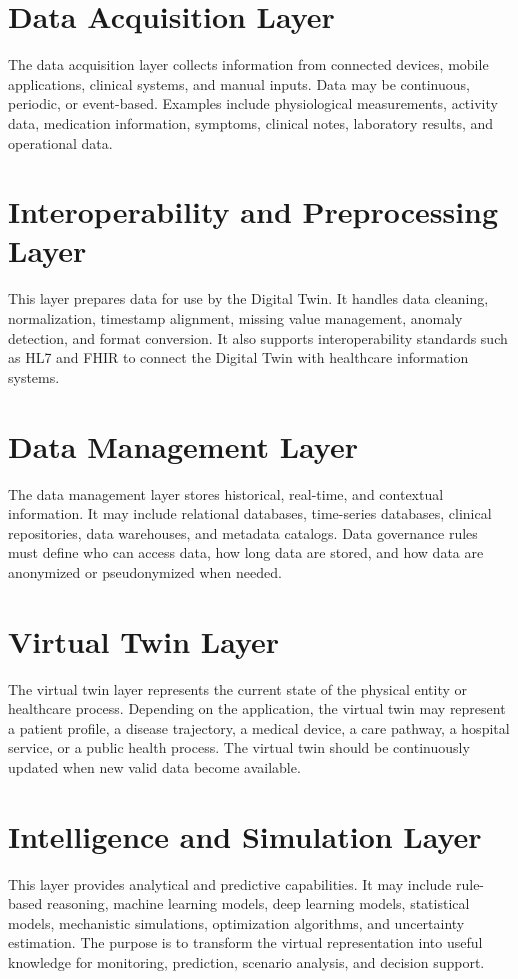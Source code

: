 \section{Data Acquisition Layer}
The data acquisition layer collects information from connected devices, mobile applications, clinical systems, and manual inputs. Data may be continuous, periodic, or event-based. Examples include physiological measurements, activity data, medication information, symptoms, clinical notes, laboratory results, and operational data.

\section{Interoperability and Preprocessing Layer}
This layer prepares data for use by the Digital Twin. It handles data cleaning, normalization, timestamp alignment, missing value management, anomaly detection, and format conversion. It also supports interoperability standards such as HL7 and FHIR to connect the Digital Twin with healthcare information systems.

\section{Data Management Layer}
The data management layer stores historical, real-time, and contextual information. It may include relational databases, time-series databases, clinical repositories, data warehouses, and metadata catalogs. Data governance rules must define who can access data, how long data are stored, and how data are anonymized or pseudonymized when needed.

\section{Virtual Twin Layer}
The virtual twin layer represents the current state of the physical entity or healthcare process. Depending on the application, the virtual twin may represent a patient profile, a disease trajectory, a medical device, a care pathway, a hospital service, or a public health process. The virtual twin should be continuously updated when new valid data become available.

\section{Intelligence and Simulation Layer}
This layer provides analytical and predictive capabilities. It may include rule-based reasoning, machine learning models, deep learning models, statistical models, mechanistic simulations, optimization algorithms, and uncertainty estimation. The purpose is to transform the virtual representation into useful knowledge for monitoring, prediction, scenario analysis, and decision support.

